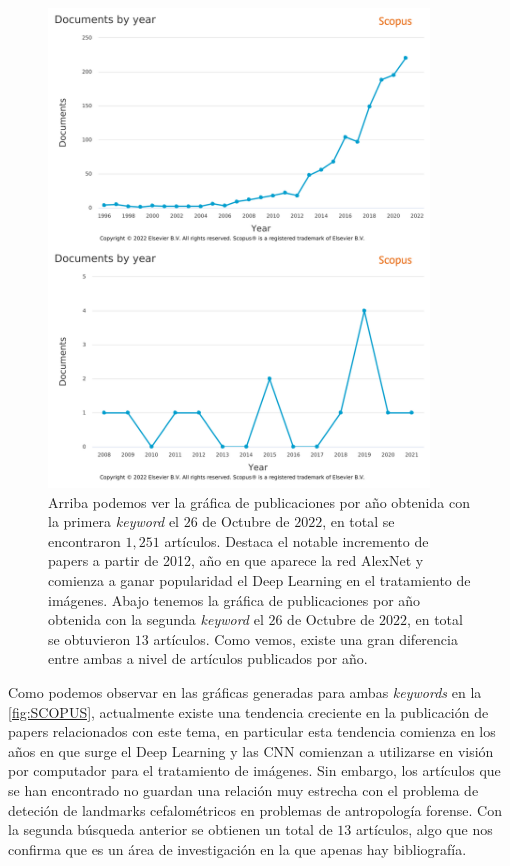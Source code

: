         \begin{figure}[htpb]
            \centering
            \includegraphics[width=0.9\textwidth]{img/SCOPUS_UNIDOS.png}
            \caption{Arriba podemos ver la gráfica de publicaciones por año obtenida con la primera \textit{keyword} el $26$ de Octubre de $2022$, en total se encontraron $1,251$ artículos. Destaca el notable incremento de papers a partir de 2012, año en que aparece la red AlexNet y comienza a ganar popularidad el Deep Learning en el tratamiento de imágenes. Abajo tenemos la gráfica de publicaciones por año obtenida con la segunda \textit{keyword} el $26$ de Octubre de $2022$, en total se obtuvieron $13$ artículos. Como vemos, existe una gran diferencia entre ambas a nivel de artículos publicados por año.}
            \label{fig:SCOPUS}
        \end{figure}
        
        \medskip
        
        \noindent Como podemos observar en las gráficas generadas para ambas \textit{keywords} en la \autoref{fig:SCOPUS}, actualmente existe una tendencia creciente en la publicación de papers relacionados con este tema, en particular esta tendencia comienza en los años en que surge el Deep Learning y las CNN comienzan a utilizarse en visión por computador para el tratamiento de imágenes. Sin embargo, los artículos que se han encontrado no guardan una relación muy estrecha con el problema de deteción de landmarks cefalométricos en problemas de antropología forense. Con la segunda búsqueda anterior se obtienen un total de $13$ artículos, algo que nos confirma que es un área de investigación en la que apenas hay bibliografía.

